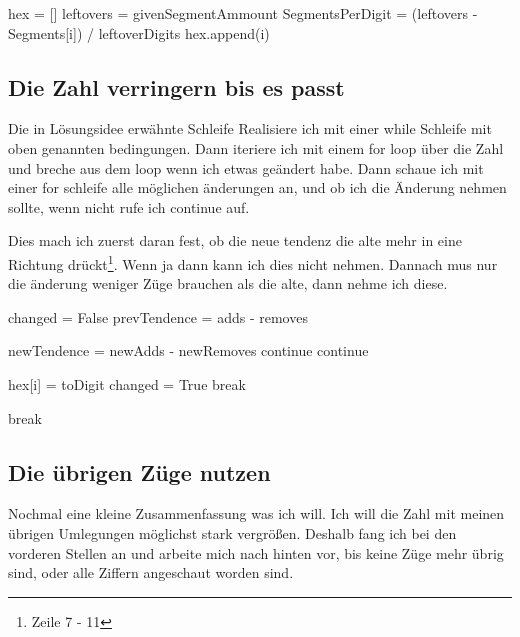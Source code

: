 \documentclass[a4paper,10pt,ngerman]{scrartcl}
\begin{document}
\begin{algorithmic}[1]
\State hex = []
\State leftovers = givenSegmentAmmount
\State SegmentsPerDigit = (leftovers - Segments[i]) / leftoverDigits
\State hex.append(i)
\EndIf
\EndFor
\EndFor
\end{algorithmic}

\subsection{Die Zahl verringern bis es passt}

Die in Lösungsidee erwähnte Schleife Realisiere ich mit einer while Schleife mit oben genannten bedingungen. Dann iteriere ich mit einem for loop über die Zahl und breche aus dem loop wenn ich etwas geändert habe. Dann schaue ich mit einer for schleife alle möglichen änderungen an, und ob ich die Änderung nehmen sollte, wenn nicht rufe ich continue auf.

Dies mach ich zuerst daran fest, ob die neue tendenz die alte mehr in eine Richtung drückt\footnote{Zeile 7 - 11}. Wenn ja dann kann ich dies nicht nehmen. Dannach mus nur die änderung weniger Züge brauchen als die alte, dann nehme ich diese.


\begin{algorithmic}[1]
\State changed = False
\State prevTendence = adds - removes

\State newTendence = newAdds - newRemoves
\State continue
\State continue
\EndIf

\State hex[i] = toDigit
\State changed = True
\State break
\EndIf

\EndFor

\State break
\EndIf
\EndFor

\EndWhile
\end{algorithmic}

\subsection{Die übrigen Züge nutzen}

Nochmal eine kleine Zusammenfassung was ich will. Ich will die Zahl mit meinen übrigen Umlegungen möglichst stark vergrößen. Deshalb fang ich bei den vorderen Stellen an und arbeite mich nach hinten vor, bis keine Züge mehr übrig sind, oder alle Ziffern angeschaut worden sind.
\end{document}
